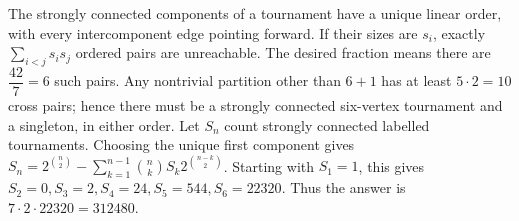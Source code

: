 The strongly connected components of a tournament have a unique linear order, with every intercomponent edge pointing forward. If their sizes are $s_i$, exactly $\sum_{i<j}s_is_j$ ordered pairs are unreachable. The desired fraction means there are $\dfrac{42}{7} = 6$ such pairs. Any nontrivial partition other than $6+1$ has at least $5\cdot2=10$ cross pairs; hence there must be a strongly connected six-vertex tournament and a singleton, in either order. Let $S_n$ count strongly connected labelled tournaments. Choosing the unique first component gives $S_n=2^{\binom n2}-\sum_{k=1}^{n-1}\binom nk S_k2^{\binom{n-k}2}$. Starting with $S_1=1$, this gives $S_2=0,S_3=2,S_4=24,S_5=544,S_6=22320$. Thus the answer is $7\cdot2\cdot22320=\boxed{312480}$.
